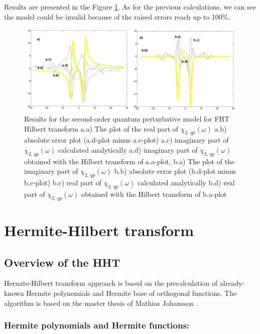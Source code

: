 \documentclass[12pt,twoside,a4paper]{article}
\numberwithin{equation}{subsection}
\numberwithin{figure}{subsection}
\begin{document}
Results are presented in the Figure \ref{fig:fht_qp2}. As for the previous calculations, we can see the model could be invalid
because of the raised errors reach up to 100\%.

\begin{figure} 
  \includegraphics[width=150mm]{img/fht_qp2.png}
  \caption{Results for the second-order quantum perturbative model for FHT Hilbert transform
     a.a) The plot of the real part of $\chi_{2, \, qp}(\omega )$
     a.b) absolute error plot (a.d-plot minus a.c-plot) 
     a.c) imaginary part of $\chi_{2, \, qp}(\omega )$ calculated analytically 
     a.d) imaginary part of $\chi_{2, \, qp}(\omega )$ obtained with the Hilbert transform of a.a-plot, 
     b.a) The plot of the imaginary part of $\chi_{2, \, qp}(\omega )$ 
     b.b) absolute error plot (b.d-plot minus b.c-plot) 
     b.c) real part of $\chi_{2, \, qp} (\omega )$ calculated analytically 
     b.d) real part of $\chi_{2, \, qp} (\omega )$ obtained with the Hilbert transform of b.a-plot 
     \label{fig:fht_qp2}
     }
\end{figure}

\section{Hermite-Hilbert transform} \label{chap:hermite}

\subsection{Overview of the HHT}  \label{chap:hermite_overview}

Hermite-Hilbert transform approach is based on the precalculation of already-known Hermite polynomials and Hermite base of orthogonal
functions. The algorithm is based on the master thesis of Mathias Johansson \cite{johansson_hilbert}.

\subsubsection*{Hermite polynomials and Hermite functions:}
\end{document}
